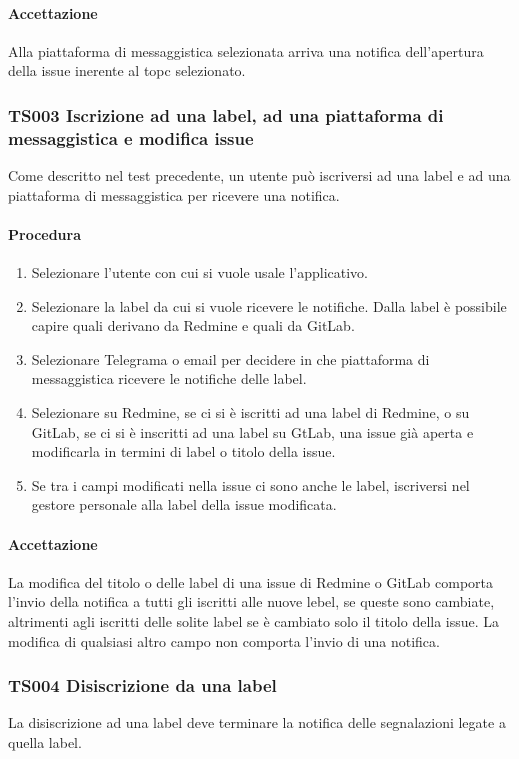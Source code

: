 		\paragraph*{Accettazione}
		Alla piattaforma di messaggistica selezionata arriva una notifica dell'apertura della issue inerente al topc selezionato.
		
	\subsubsection{TS003 Iscrizione ad una label, ad una piattaforma di messaggistica e modifica issue}
		Come descritto nel test precedente, un utente può iscriversi ad una label e ad una piattaforma di messaggistica per ricevere una notifica.
		
		\paragraph{Procedura}
			\begin{enumerate}
				\item Selezionare l'utente con cui si vuole usale l'applicativo.
				\item Selezionare la label da cui si vuole ricevere le notifiche. Dalla label è possibile capire quali derivano da Redmine e quali da GitLab.
				\item Selezionare Telegrama o email per decidere in che piattaforma di messaggistica ricevere le notifiche delle label.
				\item Selezionare su Redmine, se ci si è iscritti ad una label di Redmine, o su GitLab, se ci si è inscritti ad una label su GtLab, una issue già aperta e modificarla in termini di label o titolo della issue.
				\item Se tra i campi modificati nella issue ci sono anche le label, iscriversi nel gestore personale alla label della issue modificata.
			\end{enumerate}
		
		\paragraph{Accettazione}
		La modifica del titolo o delle label di una issue di Redmine o GitLab comporta l'invio della notifica a tutti gli iscritti alle nuove lebel, se queste sono cambiate, altrimenti agli iscritti delle solite label se è cambiato solo il titolo della issue. La modifica di qualsiasi altro campo non comporta l'invio di una notifica.
		
	\subsubsection{TS004 Disiscrizione da una label}
		La disiscrizione ad una label deve terminare la notifica delle segnalazioni legate a quella label.
		
